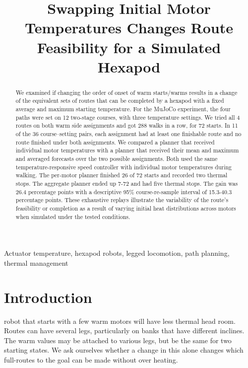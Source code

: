\documentclass{ieeeaccess}
\begin{document}

\title{Swapping Initial Motor Temperatures Changes Route Feasibility for a Simulated Hexapod}
\begin{abstract}
We examined if changing the order of onset of warm starts/warms results in a change of the equivalent sets of routes that can be completed by a hexapod with a fixed average and maximum starting temperature. For the MuJoCo experiment, the four paths were set on 12 two-stage courses, with three temperature settings. We tried all 4 routes on both warm side assignments and got 288 walks in a row, for 72 starts. In 11 of the 36 course--setting pairs, each assignment had at least one finishable route and no route finished under both assignments. We compared a planner that received individual motor temperatures with a planner that received their mean and maximum and averaged forecasts over the two possible assignments. Both used the same temperature-responsive speed controller with individual motor temperatures during walking. The per-motor planner finished 26 of 72 starts and recorded two thermal stops. The aggregate planner ended up 7-72 and had five thermal stops. The gain was 26.4 percentage points with a descriptive 95\% course-re-sample interval of 15.3-40.3 percentage points. These exhaustive replays illustrate the variability of the route's feasibility or completion as a result of varying initial heat distributions across motors when simulated under the tested conditions.
\end{abstract}

\begin{keywords}
Actuator temperature, hexapod robots, legged locomotion, path planning, thermal management
\end{keywords}
\titlepgskip=-21pt
\maketitle

\section{Introduction}

 robot that starts with a few warm motors will have less thermal head room. Routes can have several legs, particularly on banks that have different inclines. The warm values may be attached to various legs, but be the same for two starting states. We ask ourselves whether a change in this alone changes which full-routes to the goal can be made without over heating.
\end{document}
